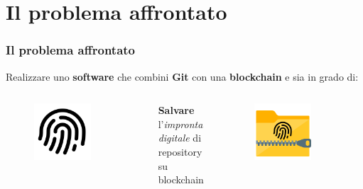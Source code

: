 \documentclass{beamer}
\begin{document}
\section{Il problema affrontato}
\begin{frame}
	\frametitle{Il problema affrontato}
	Realizzare uno \textbf{software} che combini \textbf{Git} con una \textbf{blockchain} e sia in grado di:
	\medskip
	\begin{columns}
		\centering
		\begin{figure}
			\includegraphics[width=0.7\textwidth]{figures/fingerprint.png}
		\end{figure}
		\textbf{Salvare} l'\emph{impronta digitale} di
		repository su
		blockchain
		\centering
		\begin{figure}
			\includegraphics[width=0.7\textwidth]{figures/folder_zip.png}

\end{figure}
\end{columns}
\end{frame}
\end{document}
